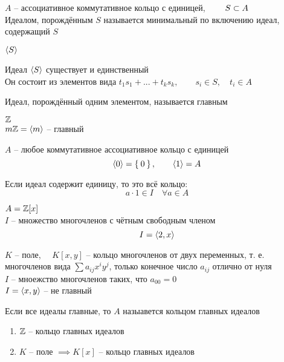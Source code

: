 \begin{definition}
	$ A $ -- ассоциативное коммутативное кольцо с единицей, $ \qquad S \subset A $ \\
	Идеалом, порождённым $ S $ называется минимальный по включению идеал, содержащий $ S $
\end{definition}

\begin{notation}
	$ \Braket{S} $
\end{notation}

\begin{props}
	\item Идеал $ \Braket{S} $ существует и единственный \\
	Он состоит из элементов вида $ t_1s_1 + ... + t_ks_k, \qquad s_i \in S, \quad t_i \in A $
\end{props}

\begin{definition}
	Идеал, порождённый одним элементом, называется главным
\end{definition}

\begin{exmpls}
	\item $ \mathbb{Z} $ \\
	$ m\mathbb{Z} = \Braket{m} $ -- главный
	\item $ A $ -- любое коммутативное ассоциативное кольцо с единицей
	$$ \Braket{0} = \Set{0}, \qquad \Braket{1} = A $$
	\begin{remark}
		Если идеал содержит единицу, то это всё кольцо:
		$$ a \cdot 1 \in I \quad \forall a \in A $$
	\end{remark}
	\item $ A = \mathbb{Z}[x] $ \\
	$ I $ -- множество многочленов с чётным свободным членом
	$$ I = \Braket{2, x} $$
	\item $ K $ -- поле, $ \quad K[x, y] $ -- кольцо многочленов от двух переменных, т. е. многочленов вида $ \sum a_{ij}x^iy^j $, только конечное число $ a_{ij} $ отлично от нуля \\
	$ I $ -- мноежство многочленов таких, что $ a_{00} = 0 $ \\
	$ I = \Braket{x, y} $ -- не главный
\end{exmpls}

\begin{definition}
	Если все идеалы главные, то $ A $ назыавется кольцом главных идеалов
\end{definition}

\begin{theorem}
	\hfill
	\begin{enumerate}
		\item $ \mathbb{Z} $ -- кольцо главных идеалов

		\item $ K $ -- поле $ \implies K[x] $ -- кольцо главных идеалов
	\end{enumerate}
\end{theorem}

